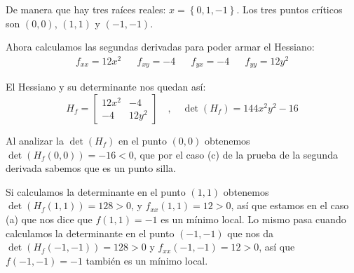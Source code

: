 \documentclass[12pt]{article}
\begin{document}
De manera que hay tres raíces reales: $ x=\left\{0,1,-1\right\} $. Los tres puntos críticos son $ (0,0) $, $ (1,1) $ y $ (-1,-1) $.

Ahora calculamos las segundas derivadas para poder armar el Hessiano:
\begin{align*}
  f_{xx} = 12x^2 && f_{xy} = -4 && f_{yx} = -4 && f_{yy} = 12y^2
\end{align*}

El Hessiano y su determinante nos quedan así:
\[H_{f}=
  \begin{bmatrix}
	  12x^2 & -4 \\
	  -4 & 12y^2
  \end{bmatrix} \quad  , \quad 
 \det(H_{f}) = 144x^2y^2-16 
\]

Al analizar la $ \det(H_{f}) $ en el punto $ (0,0) $ obtenemos $ \det(H_{f}(0,0))=-16 < 0 $, que por el caso (c) de la prueba de la segunda derivada sabemos que es un punto silla.

Si calculamos la determinante en el punto $ (1,1) $ obtenemos $ \det(H_{f}(1,1))=128>0 $, y $ f_{xx}(1,1)=12>0 $, así que estamos en el caso (a) que nos dice que $ f(1,1)=-1 $ es un mínimo local. Lo mismo pasa cuando calculamos la determinante en el punto $ (-1,-1) $ que nos da $ \det(H_{f}(-1,-1))=128>0 $ y $ f_{xx}(-1,-1)=12>0 $, así que $ f(-1,-1)=-1 $ también es un mínimo local.


\begin{center}
\end{center}
\end{document}
